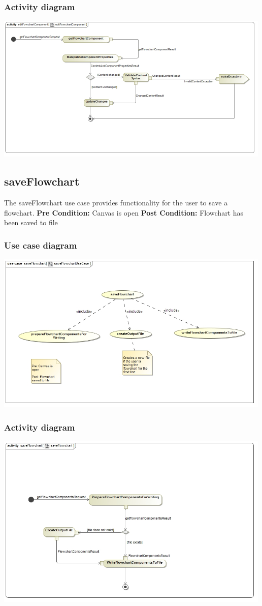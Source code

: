 \documentclass[11pt,a4paper,titlepage]{article}
\begin{document}
\subsubsection{Activity diagram}
\includegraphics[width=500px]{editFowchartComponent.jpg}

\subsection{saveFlowchart}
The saveFlowchart use case provides functionality for the user to save a flowchart.\newline\newline
\textbf{Pre Condition:} Canvas is open\newline\newline
\textbf{Post Condition:} Flowchart has been saved to file

\subsubsection{Use case diagram}
\includegraphics[width=500px]{saveFlowchartUseCase.jpg}

\subsubsection{Activity diagram}
\includegraphics[width=500px]{saveFlowchart.jpg}
	
\end{document}
